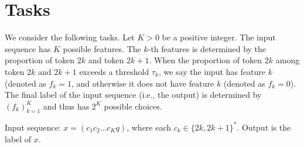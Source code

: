\section{Tasks}

We consider the following tasks. Let $K > 0$ be a positive integer. The input sequence has $K$ possible features. The $k$-th features is determined by the proportion of token $2k$ and token $2k+1$. When the proportion of token $2k$ among token $2k$ and $2k+1$ exceeds a threshold $\tau_k$, we say the input has feature $k$ (denoted as $f_k = 1$, and otherwise it does not have feature $k$ (denoted as $f_k = 0$). The final label of the input sequence (i.e., the output) is determined by $(f_k)_{k=1}^K$ and thus has $2^K$ possible choices.

Input sequence: $x = (c_1 c_2 \ldots c_K q)$, where each $c_k \in \{2k, 2k+1\}^*$. Output is the label of $x$. 